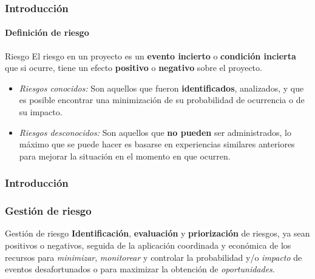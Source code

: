 \frame
{
\frametitle{Introducción}
\framesubtitle{Definición de riesgo}

\begin{block}{Riesgo}
	El riesgo en un proyecto es un \textbf{evento incierto} o \textbf{condición incierta} que si ocurre,
	tiene un efecto \textbf{positivo} o \textbf{negativo} sobre el proyecto.
\end{block}

\begin{itemize}
	\item <2->\emph{Riesgos conocidos:}
		Son aquellos que fueron \textbf{identificados}, analizados, y que es posible encontrar
		una minimización de su probabilidad de ocurrencia o de su impacto.
	\item <3->\emph{Riesgos desconocidos:}
		Son aquellos que \textbf{no pueden} ser administrados, lo máximo que se puede hacer es
		basarse en experiencias similares anteriores para mejorar la situación en el
		momento en que ocurren.
\end{itemize}
}

\frame
{
\frametitle{Introducción}
\frametitle{Gestión de riesgo}

\begin{block}{Gestión de riesgo}
	\textbf{Identificación}, \textbf{evaluación} y \textbf{priorización} de riesgos, ya sean positivos o negativos,
	seguida de la aplicación coordinada y económica de los recursos para \emph{minimizar},
	\emph{monitorear} y controlar la probabilidad y/o \emph{impacto} de eventos desafortunados o para
	maximizar la obtención de \emph{oportunidades}.
\end{block}

}
